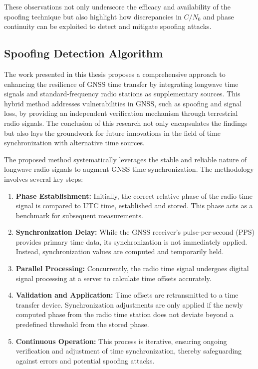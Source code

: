 \documentclass[12pt, a4paper]{extarticle}
\begin{document}
These observations not only underscore the efficacy and availability of the
spoofing technique but also highlight how discrepancies in $C/N_0$ and phase
continuity can be exploited to detect and mitigate spoofing attacks.

\subsection{Spoofing Detection Algorithm}

The work presented in this thesis proposes a comprehensive approach to
enhancing the resilience of GNSS time transfer by integrating longwave time
signals and standard-frequency radio stations as supplementary sources. This
hybrid method addresses vulnerabilities in GNSS, such as spoofing and signal
loss, by providing an independent verification mechanism through terrestrial
radio signals. The conclusion of this research not only encapsulates the
findings but also lays the groundwork for future innovations in the field of
time synchronization with alternative time sources.

The proposed method systematically leverages the stable and reliable nature of
longwave radio signals to augment GNSS time synchronization. The methodology
involves several key steps:
\begin{enumerate}[noitemsep]
    \item \textbf{Phase Establishment:} Initially, the correct relative phase
        of the radio time signal is compared to UTC time, established and
        stored. This phase acts as a benchmark for subsequent measurements.
    \item \textbf{Synchronization Delay:} While the GNSS receiver's
        pulse-per-second (PPS) provides primary time data, its synchronization
        is not immediately applied. Instead, synchronization values are
        computed and temporarily held.
    \item \textbf{Parallel Processing:} Concurrently, the radio time signal
        undergoes digital signal processing at a server to calculate time
        offsets accurately.
    \item \textbf{Validation and Application:} Time offsets are retransmitted
        to a time transfer device. Synchronization adjustments are only applied
        if the newly computed phase from the radio time station does not
        deviate beyond a predefined threshold from the stored phase.
    \item \textbf{Continuous Operation:} This process is iterative, ensuring
        ongoing verification and adjustment of time synchronization, thereby
        safeguarding against errors and potential spoofing attacks.
\end{enumerate}
\end{document}
